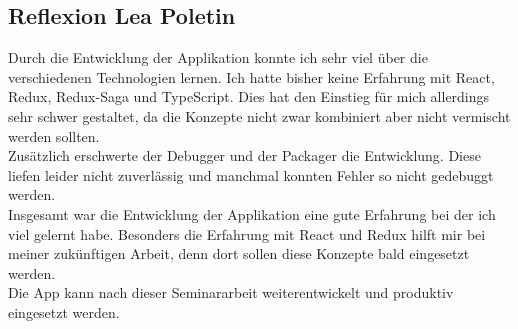 \subsection{Reflexion Lea Poletin}
Durch die Entwicklung der Applikation konnte ich sehr viel über die verschiedenen Technologien lernen. 
Ich hatte bisher keine Erfahrung mit React, Redux, Redux-Saga und TypeScript. 
Dies hat den Einstieg für mich allerdings sehr schwer gestaltet, da die Konzepte nicht 
zwar kombiniert aber nicht vermischt werden sollten.\\
Zusätzlich erschwerte der Debugger und der Packager die Entwicklung. 
Diese liefen leider nicht zuverlässig und manchmal konnten Fehler so nicht 
gedebuggt werden. \\
Insgesamt war die Entwicklung der Applikation eine gute Erfahrung bei der ich viel gelernt habe. 
Besonders die Erfahrung mit React und Redux hilft mir bei meiner zukünftigen Arbeit, denn dort sollen
diese Konzepte bald eingesetzt werden.\\
Die App kann nach dieser Seminararbeit weiterentwickelt und produktiv eingesetzt werden. 